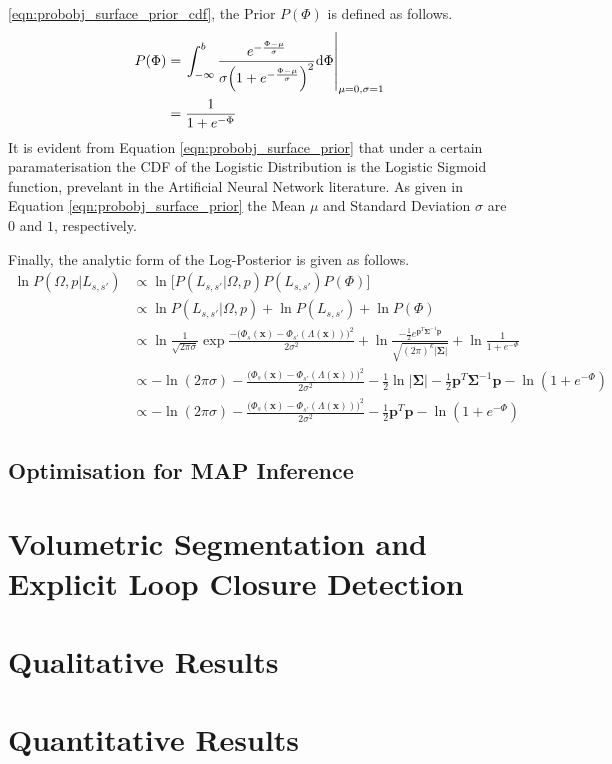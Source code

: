 \ref{eqn:probobj_surface_prior_cdf}, the Prior $P(\Phi)$ is defined as follows.
\begin{align}
  \label{eqn:probobj_surface_prior}
  P(\Phi) &= \left. \int_{-\infty}^{b} \frac
  {e^{-\frac{\Phi - \mu}{\sigma}}}
  {\sigma \Big( 1 + e^{-\frac{\Phi - \mu}{\sigma}} \Big)^{2}} {\mathrm d{\Phi}}
  \right\rvert_{\mu = 0, \sigma = 1}\\
  &= \frac{1}{1 + e^{-\Phi}}
\end{align}
It is evident from Equation \ref{eqn:probobj_surface_prior} that under a certain
paramaterisation the CDF of the Logistic Distribution is the Logistic Sigmoid
function, prevelant in the Artificial Neural Network literature. As given in
Equation \ref{eqn:probobj_surface_prior} the Mean $\mu$ and Standard Deviation
$\sigma$ are $0$ and $1$, respectively.

Finally, the analytic form of the Log-Posterior is given as follows.
\begin{align}
  \label{eqn:probobj_log_posterior}
  \ln P(\Omega, p | L_{s, s'}) &\propto \ln
  \Big[ P(L_{s, s'} | \Omega, p)P(L_{s, s'})P(\Phi)\Big]\\
  &\propto \ln P(L_{s, s'} | \Omega, p) + \ln P(L_{s, s'}) + \ln P(\Phi)\\
  &\propto \ln \frac{1}{\sqrt{2 \pi \sigma}}
  \exp{\frac{-\big(\Phi_{s}(\mathbf{x}) - \Phi_{s'}(\Lambda(\mathbf{x}))\big)^{2}}
  {2\sigma^{2}}} +
  \ln \frac{-\frac{1}{2} e^{\mathbf{p}^{T}\mathbf{\Sigma}^{-1}\mathbf{p}}}
  {\sqrt{(2\pi)^{k}\left|\mathbf{\Sigma}\right|}} +
  \ln \frac{1}{1 + e^{-\Phi}}\\
  &\propto -\ln(2\pi\sigma) - \frac{\big(\Phi_{s}(\mathbf{x}) -
  \Phi_{s'}(\Lambda(\mathbf{x}))\big)^{2}}{2\sigma^{2}} -
  \frac{1}{2} \ln \left|\mathbf{\Sigma}\right| -
  \frac{1}{2} \mathbf{p}^{T}\mathbf{\Sigma}^{-1}\mathbf{p} -
  \ln(1 + e^{-\Phi})\\
  &\propto -\ln(2\pi\sigma) - \frac{\big(\Phi_{s}(\mathbf{x}) -
  \Phi_{s'}(\Lambda(\mathbf{x}))\big)^{2}}{2\sigma^{2}} -
  \frac{1}{2} \mathbf{p}^{T}\mathbf{p} -
  \ln(1 + e^{-\Phi})
\end{align}

\subsection{Optimisation for MAP Inference}
\label{subsec:probobj_map_optimisation}


\section{Volumetric Segmentation and Explicit Loop Closure Detection}

\section{Qualitative Results}

\section{Quantitative Results}